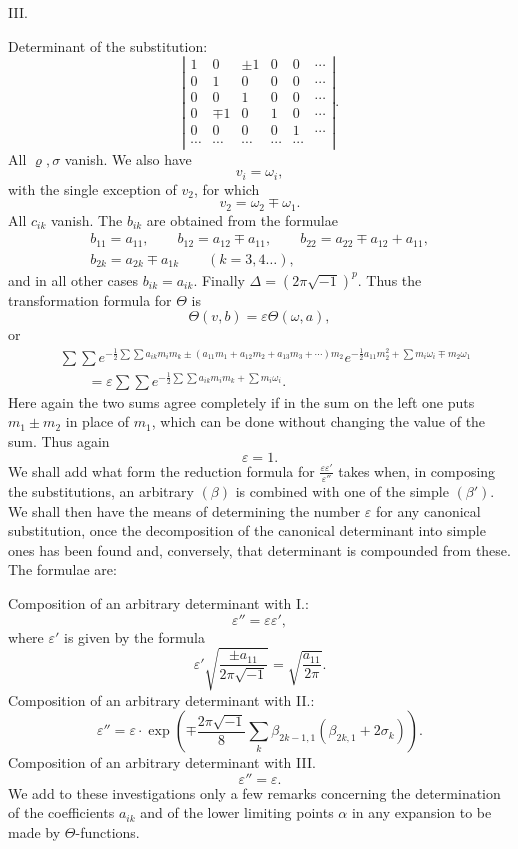 \documentclass[10pt]{article}
\begin{document}
\begin{center}III.\end{center}

Determinant of the substitution:
\[
\left|\begin{array}{cccccc}
1&0&\pm1&0&0&\cdots\\
0&1&0&0&0&\cdots\\
0&0&1&0&0&\cdots\\
0&\mp1&0&1&0&\cdots\\
0&0&0&0&1&\cdots\\
\cdots&\cdots&\cdots&\cdots&\cdots&
\end{array}\right|.
\]
All \(\varrho,\sigma\) vanish. We also have
\[
v_i=\omega_i,
\]
with the single exception of \(v_2\), for which
\[
v_2=\omega_2\mp\omega_1.
\]
All \(c_{ik}\) vanish. The \(b_{ik}\) are obtained from the formulae
\[
\begin{gathered}
b_{11}=a_{11},\qquad b_{12}=a_{12}\mp a_{11},\qquad b_{22}=a_{22}\mp a_{12}+a_{11},\\
b_{2k}=a_{2k}\mp a_{1k}\qquad(k=3,4\ldots),
\end{gathered}
\]
and in all other cases \(b_{ik}=a_{ik}\). Finally \(\Delta=(2\pi\sqrt{-1})^p\). Thus the transformation formula for \(\Theta\) is
\[
\Theta(v,b)=\varepsilon\Theta(\omega,a),
\]
or
\[
\begin{aligned}
&\sum\sum e^{-\frac12\sum\sum a_{ik}m_im_k\pm(a_{11}m_1+a_{12}m_2+a_{13}m_3+\cdots)m_2}
 e^{-\frac12a_{11}m_2^2+\sum m_i\omega_i\mp m_2\omega_1}\\
&\qquad=\varepsilon\sum\sum e^{-\frac12\sum\sum a_{ik}m_im_k+\sum m_i\omega_i}.
\end{aligned}
\]
Here again the two sums agree completely if in the sum on the left one puts \(m_1\pm m_2\) in place of \(m_1\), which can be done without changing the value of the sum. Thus again
\[
\varepsilon=1.
\]
We shall add what form the reduction formula for \(\frac{\varepsilon\varepsilon'}{\varepsilon''}\) takes when, in composing the substitutions, an arbitrary \((\beta)\) is combined with one of the simple \((\beta')\). We shall then have the means of determining the number \(\varepsilon\) for any canonical substitution, once the decomposition of the canonical determinant into simple ones has been found and, conversely, that determinant is compounded from these. The formulae are:

Composition of an arbitrary determinant with I.:
\[
\varepsilon''=\varepsilon\varepsilon',
\]
where \(\varepsilon'\) is given by the formula
\[
\varepsilon'\sqrt{\frac{\pm a_{11}}{2\pi\sqrt{-1}}}=\sqrt{\frac{a_{11}}{2\pi}}.
\]
Composition of an arbitrary determinant with II.:
\[
\varepsilon''=\varepsilon\cdot
\exp\!\left(\mp\frac{2\pi\sqrt{-1}}8\sum_k\beta_{2k-1,1}(\beta_{2k,1}+2\sigma_k)\right).
\]
Composition of an arbitrary determinant with III.
\[
\varepsilon''=\varepsilon.
\]
We add to these investigations only a few remarks concerning the determination of the coefficients \(a_{ik}\) and of the lower limiting points \(\alpha\) in any expansion to be made by \(\Theta\)-functions.
\end{document}
